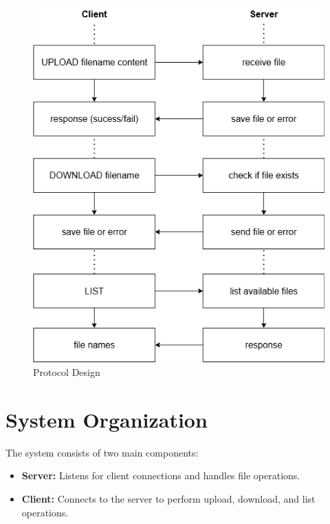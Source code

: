 \documentclass[a4paper,12pt]{article}
\begin{document}
\begin{figure}[h]
    \centering
    \includegraphics[width=\textwidth]{protocol_design.png} %
    \caption{Protocol Design}
    \label{fig:protocol}
\end{figure}

\section*{System Organization}
The system consists of two main components:
\begin{itemize}
    \item \textbf{Server:} Listens for client connections and handles file operations.
    \item \textbf{Client:} Connects to the server to perform upload, download, and list operations.
\end{itemize}
\end{document}

